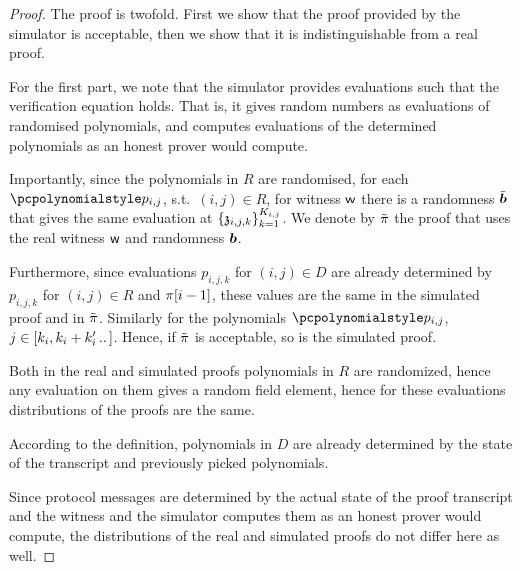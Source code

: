 \documentclass[runningheads,11pt]{llncs}
\let\spvec\vec
\let\vec\accentvec
\let\spvec\vec
\let\vec\spvec
\def\vec#1{\mathchoice{\mbox{\boldmath$\displaystyle#1$}}
  {\mbox{\boldmath$\textstyle#1$}} {\mbox{\boldmath$\scriptstyle#1$}}
  {\mbox{\boldmath$\scriptscriptstyle#1$}}}
\begin{document}
\begin{proof}
  The proof is twofold. First we show that the proof provided by the simulator is
  acceptable, then we show that it is indistinguishable from a real proof.

   For the first part, we note that the simulator provides
  evaluations such that the verification equation holds. That is, it gives random
  numbers as evaluations of randomised polynomials, and computes evaluations of the
  determined polynomials as an honest prover would compute.

  Importantly, since the polynomials in $R$ are randomised, for each $\p{p}_{i, j}$,
  s.t.~$(i, j) \in R$, for witness $\mathsf{w}$ there is a randomness $\tilde{\vec{b}}$
  that gives the same evaluation at $\{\mathfrak{z}_{i, j, k}\}_{k = 1}^{K_{i, j}}$.
   We denote by $\tilde{\pi}$ the
  proof that uses the real witness $\mathsf{w}$ and randomness $\vec{b}$.

  Furthermore, since evaluations $p_{i, j, k}$ for $(i, j) \in D$ are already
  determined by $p_{i, j, k}$ for $(i, j) \in R$ and $\pi [i - 1]$, these values
  are the same in the simulated proof and in $\tilde{\pi}$. Similarly for the
  polynomials $\p{p}_{i, j}$, $j \in \range{k_i, k_i + k'_{i}}$. Hence, if
  $\tilde{\pi}$ is acceptable, so is the simulated proof.
  
   Both in the real and simulated proofs polynomials in $R$ are
  randomized, hence any evaluation on them gives a random field element, hence for
  these evaluations distributions of the proofs are the same.

  According to the definition, polynomials in $D$ are already determined by the state
  of the transcript and previously picked polynomials. 

  Since protocol messages are determined by the actual state of the proof transcript
  and the witness and the simulator computes them as an honest prover would compute,
  the distributions of the real and simulated proofs do not differ here as well.
\end{proof}


\iffalse
\begin{theorem}
  Zero knowledge, as defined in \cref{def:ips_zk}, implies zero-knowledge as defined
  in \hl{AHP zero knowledge reference}.
\end{theorem}
\begin{proof}
\end{proof}
\fi
\end{document}
